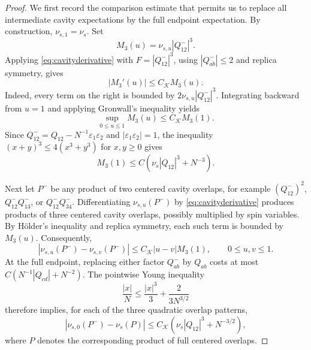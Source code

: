 \documentclass[11pt]{article}
\numberwithin{equation}{section}
\theoremstyle{plain}
\theoremstyle{definition}
\newcommand{\1}{\mathbf 1}
\newcommand{\cK}{\mathcal K}
\begin{document}
\begin{proof}
We first record the comparison estimate that permits us to replace all
intermediate cavity expectations by the full endpoint expectation.  By
construction, $\nu_{s,1}=\nu_s$.  Set
\begin{equation}
 M_3(u)=\nu_{s,u}|Q^-_{12}|^3.
 \label{eq:cavityM3}
\end{equation}
Applying \eqref{eq:cavityderivative} with
$F=|Q^-_{12}|^3$, using $|Q^-_{ab}|\le2$ and replica symmetry, gives
\begin{equation}
 |M_3'(u)|\le C_{\cK}M_3(u).
 \label{eq:cavityM3derivative}
\end{equation}
Indeed, every term on the right is bounded by
$2\nu_{s,u}|Q^-_{12}|^3$.  Integrating backward from $u=1$ and applying
Gronwall's inequality yields
\begin{equation}
 \sup_{0\le u\le1}M_3(u)\le C_{\cK}M_3(1).
 \label{eq:cavityM3comparison}
\end{equation}
Since
$Q^-_{12}=Q_{12}-N^{-1}\varepsilon_1\varepsilon_2$ and
$|\varepsilon_1\varepsilon_2|=1$, the inequality
$(x+y)^3\le4(x^3+y^3)$ for $x,y\ge0$ gives
\begin{equation}
 M_3(1)\le C\left(\nu_s|Q_{12}|^3+N^{-3}\right).
 \label{eq:cavityM3endpoint}
\end{equation}

Next let $P^-$ be any product of two centered cavity overlaps, for
example $(Q^-_{12})^2$, $Q^-_{12}Q^-_{13}$, or
$Q^-_{12}Q^-_{34}$.  Differentiating $\nu_{s,u}(P^-)$ by
\eqref{eq:cavityderivative} produces products of three centered cavity
overlaps, possibly multiplied by spin variables.  By H\"older's
inequality and replica symmetry, each such term is bounded by $M_3(u)$.
Consequently,
\begin{equation}
 \left|\nu_{s,u}(P^-)-\nu_{s,v}(P^-)\right|
 \le C_{\cK}|u-v|M_3(1),
 \qquad 0\le u,v\le1.
 \label{eq:cavityquadraticcomparison}
\end{equation}
At the full endpoint, replacing either factor $Q^-_{ab}$ by $Q_{ab}$
costs at most
$C(N^{-1}|Q_{cd}|+N^{-2})$.  The pointwise Young inequality
\begin{equation}
 \frac{|x|}{N}\le\frac{|x|^3}{3}+\frac{2}{3N^{3/2}}
 \label{eq:cavityYoung}
\end{equation}
therefore implies, for each of the three quadratic overlap patterns,
\begin{equation}
 \left|\nu_{s,0}(P^-)-\nu_s(P)\right|
 \le C_{\cK}\left(\nu_s|Q_{12}|^3+N^{-3/2}\right),
 \label{eq:cavityendpointcomparison}
\end{equation}
where $P$ denotes the corresponding product of full centered overlaps.


\end{proof}
\end{document}
